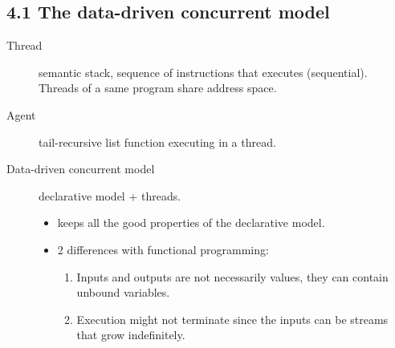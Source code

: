 \subsection{4.1 The data-driven concurrent model}

\begin{description}
  \item[Thread] semantic stack, sequence of instructions that executes (sequential).
    Threads of a same program share address space.
  \item[Agent] tail-recursive list function executing in a thread.
  \item[Data-driven concurrent model] declarative model + threads.
    \begin{itemize}
      \item keeps all the good properties of the declarative model.
      \item 2 differences with functional programming:
        \begin{enumerate}
          \item Inputs and outputs are not necessarily values, they can contain unbound variables.
          \item Execution might not terminate since the inputs can be streams that grow indefinitely.
        \end{enumerate}
    \end{itemize}


\end{description}
